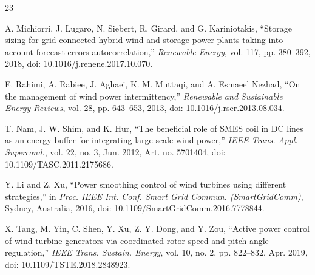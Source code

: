 \documentclass[lettersize,journal]{IEEEtran}
\begin{document}
\begin{thebibliography}{23}



A. Michiorri, J. Lugaro, N. Siebert, R. Girard, and G. Kariniotakis, ``Storage sizing for grid connected hybrid wind and storage power plants taking into account forecast errors autocorrelation,'' \textit{Renewable Energy}, vol. 117, pp. 380--392, 2018, doi: 10.1016/j.renene.2017.10.070.

E. Rahimi, A. Rabiee, J. Aghaei, K. M. Muttaqi, and A. Esmaeel Nezhad, ``On the management of wind power intermittency,'' \textit{Renewable and Sustainable Energy Reviews}, vol. 28, pp. 643--653, 2013, doi: 10.1016/j.rser.2013.08.034.

T. Nam, J. W. Shim, and K. Hur, ``The beneficial role of SMES coil in DC lines as an energy buffer for integrating large scale wind power,'' \textit{IEEE Trans. Appl. Supercond.}, vol. 22, no. 3, Jun. 2012, Art. no. 5701404, doi: 10.1109/TASC.2011.2175686.

Y. Li and Z. Xu, ``Power smoothing control of wind turbines using different strategies,'' in \textit{Proc. IEEE Int. Conf. Smart Grid Commun. (SmartGridComm)}, Sydney, Australia, 2016, doi: 10.1109/SmartGridComm.2016.7778844.

X. Tang, M. Yin, C. Shen, Y. Xu, Z. Y. Dong, and Y. Zou, ``Active power control of wind turbine generators via coordinated rotor speed and pitch angle regulation,'' \textit{IEEE Trans. Sustain. Energy}, vol. 10, no. 2, pp. 822--832, Apr. 2019, doi: 10.1109/TSTE.2018.2848923.


\end{thebibliography}
\end{document}
